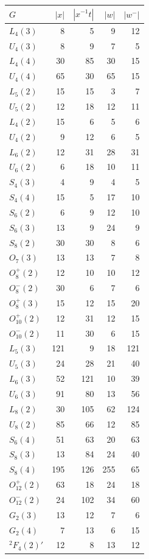 \begin{tabular}{lrrrr}\toprule
$G$&$|x|$&$|x^{-1}t|$&$|w|$&$|w^-|$\\\midrule
$L_{4}(3)$&8&5&9&12\\
$U_{4}(3)$&8&9&7&5\\
$L_{4}(4)$&30&85&30&15\\
$U_{4}(4)$&65&30&65&15\\
$L_{5}(2)$&15&15&3&7\\
$U_{5}(2)$&12&18&12&11\\
$L_{4}(2)$&15&6&5&6\\
$U_{4}(2)$&9&12&6&5\\
$L_{6}(2)$&12&31&28&31\\
$U_{6}(2)$&6&18&10&11\\
$S_{4}(3)$&4&9&4&5\\
$S_{4}(4)$&15&5&17&10\\
$S_{6}(2)$&6&9&12&10\\
$S_{6}(3)$&13&9&24&9\\
$S_{8}(2)$&30&30&8&6\\
$O_{7}(3)$&13&13&7&8\\
$O_{8}^{+}(2)$&12&10&10&12\\
$O_{8}^{-}(2)$&30&6&7&6\\
$O_{8}^{+}(3)$&15&12&15&20\\
$O_{10}^{+}(2)$&12&31&12&15\\
$O_{10}^{-}(2)$&11&30&6&15\\
$L_{5}(3)$&121&9&18&121\\
$U_{5}(3)$&24&28&21&40\\
$L_{6}(3)$&52&121&10&39\\
$U_{6}(3)$&91&80&13&56\\
$L_{8}(2)$&30&105&62&124\\
$U_{8}(2)$&85&66&12&85\\
$S_{6}(4)$&51&63&20&63\\
$S_{8}(3)$&13&84&24&40\\
$S_{8}(4)$&195&126&255&65\\
$O_{12}^{+}(2)$&63&18&24&18\\
$O_{12}^{-}(2)$&24&102&34&60\\
$G_{2}(3)$&13&12&7&6\\
$G_{2}(4)$&7&13&6&15\\
${}^2F_4(2)\prime$&12&8&13&12\\
\bottomrule\end{tabular}
